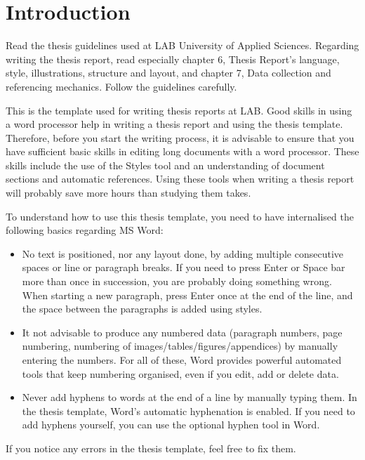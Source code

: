 \chapter{Introduction}

Read the thesis guidelines used at LAB University of Applied Sciences. Regarding
writing the thesis report, read especially chapter 6, Thesis Report’s language,
style, illustrations, structure and layout, and chapter 7, Data collection and
referencing mechanics. Follow the guidelines carefully.

This is the template used for writing thesis reports at LAB. Good skills in
using a word processor help in writing a thesis report and using the thesis
template. Therefore, before you start the writing process, it is advisable to
ensure that you have sufficient basic skills in editing long documents with a
word processor. These skills include the use of the Styles tool and an
understanding of document sections and automatic references. Using these tools
when writing a thesis report will probably save more hours than studying them
takes.

To understand how to use this thesis template, you need to have internalised the
following basics regarding MS Word:

\begin{itemize}
  \item No text is positioned, nor any layout done, by adding multiple
  consecutive spaces or line or paragraph breaks. If you need to press Enter or
  Space bar more than once in succession, you are probably doing something
  wrong. When starting a new paragraph, press Enter once at the end of the line,
  and the space between the paragraphs is added using styles.
  \item It not advisable to produce any numbered data (paragraph numbers, page
  numbering, numbering of images/tables/figures/appendices) by manually entering
  the numbers. For all of these, Word provides powerful automated tools that
  keep numbering organised, even if you edit, add or delete data.
  \item Never add hyphens to words at the end of a line by manually typing them.
  In the thesis template, Word’s automatic hyphenation is enabled. If you need
  to add hyphens yourself, you can use the optional hyphen tool in Word.
\end{itemize}

If you notice any errors in the thesis template, feel free to fix them.
